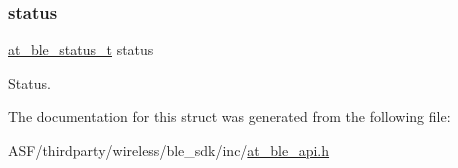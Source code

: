 \subsubsection{\texorpdfstring{status}{status}}
{\footnotesize\ttfamily \mbox{\hyperlink{group__error__codes__group_ga3b1db9b95feb157b3c188ca27fe76988}{at\+\_\+ble\+\_\+status\+\_\+t}} status}



Status. 



The documentation for this struct was generated from the following file\+:\begin{DoxyCompactItemize}
\item 
A\+S\+F/thirdparty/wireless/ble\+\_\+sdk/inc/\mbox{\hyperlink{at__ble__api_8h}{at\+\_\+ble\+\_\+api.\+h}}\end{DoxyCompactItemize}
